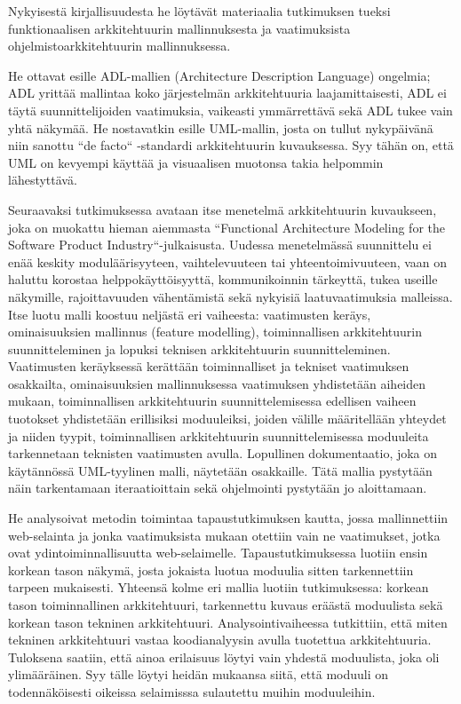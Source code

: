 \documentclass[finnish]{tktltiki2}
\theoremstyle{definition}
\theoremstyle{remark}
\begin{document}
Nykyisestä kirjallisuudesta he löytävät materiaalia tutkimuksen tueksi funktionaalisen arkkitehtuurin mallinnuksesta ja vaatimuksista ohjelmistoarkkitehtuurin mallinnuksessa.
\iffalse
Funktionaalisen arkkitehtuurin mallinuksesta he viittaavat Brinkkemperin tutkimukseen, jossa tutkittiin funktionaalisen arkkitehtuurin diagrammien käyttöä ja jonka tulos oli, että niiden käyttö on rajoittunutta tiettyihin alueisiin ja usein rakenteiltaan sekavahkoa. He jatkavat viittaamalla myös Vlietin tutkimukseen, jossa tultiin päätelmään, että arkkitehtuurin suunnittelun pitäisi sijaita vaatimusten keräysten ja teknisen suunnittelun välissä. 
Vaatimuksista 
\fi
He ottavat esille ADL-mallien (Architecture Description Language) ongelmia; ADL yrittää mallintaa koko järjestelmän arkkitehtuuria laajamittaisesti, ADL ei täytä suunnittelijoiden vaatimuksia, vaikeasti ymmärrettävä sekä ADL tukee vain yhtä näkymää. He nostavatkin esille UML-mallin, josta on tullut nykypäivänä niin sanottu ``de facto`` -standardi arkkitehtuurin kuvauksessa. Syy tähän on, että UML on kevyempi käyttää ja visuaalisen muotonsa takia helpommin lähestyttävä. 

Seuraavaksi tutkimuksessa avataan itse menetelmä arkkitehtuurin kuvaukseen, joka on muokattu hieman aiemmasta ``Functional Architecture Modeling for the Software Product Industry``-julkaisusta. Uudessa menetelmässä suunnittelu ei enää keskity moduläärisyyteen, vaihtelevuuteen tai yhteentoimivuuteen, vaan on haluttu korostaa helppokäyttöisyyttä, kommunikoinnin tärkeyttä, tukea useille näkymille, rajoittavuuden vähentämistä sekä nykyisiä laatuvaatimuksia malleissa. Itse luotu malli koostuu neljästä eri vaiheesta: vaatimusten keräys, ominaisuuksien mallinnus (feature modelling), toiminnallisen arkkitehtuurin suunnitteleminen ja lopuksi teknisen arkkitehtuurin suunnitteleminen. Vaatimusten keräyksessä kerättään toiminnalliset ja tekniset vaatimuksen osakkailta, ominaisuuksien mallinnuksessa vaatimuksen yhdistetään aiheiden mukaan, toiminnallisen arkkitehtuurin suunnittelemisessa edellisen vaiheen tuotokset yhdistetään erillisiksi moduuleiksi, joiden välille määritellään yhteydet ja niiden tyypit, toiminnallisen arkkitehtuurin suunnittelemisessa moduuleita tarkennetaan teknisten vaatimusten avulla. Lopullinen dokumentaatio, joka on käytännössä UML-tyylinen malli, näytetään osakkaille. Tätä mallia pystytään näin tarkentamaan iteraatioittain sekä ohjelmointi pystytään jo aloittamaan. 

He analysoivat metodin toimintaa tapaustutkimuksen kautta, jossa mallinnettiin web-selainta ja jonka vaatimuksista mukaan otettiin vain ne vaatimukset, jotka ovat ydintoiminnallisuutta web-selaimelle. Tapaustutkimuksessa luotiin ensin korkean tason näkymä, josta jokaista luotua moduulia sitten tarkennettiin tarpeen mukaisesti. Yhteensä kolme eri mallia luotiin tutkimuksessa: korkean tason toiminnallinen arkkitehtuuri, tarkennettu kuvaus eräästä moduulista sekä korkean tason tekninen arkkitehtuuri. Analysointivaiheessa tutkittiin, että miten tekninen arkkitehtuuri vastaa koodianalyysin avulla tuotettua arkkitehtuuria. Tuloksena saatiin, että ainoa erilaisuus löytyi vain yhdestä moduulista, joka oli ylimääräinen. Syy tälle löytyi heidän mukaansa siitä, että moduuli on todennäköisesti oikeissa selaimisssa sulautettu muihin moduuleihin. 
\end{document}
